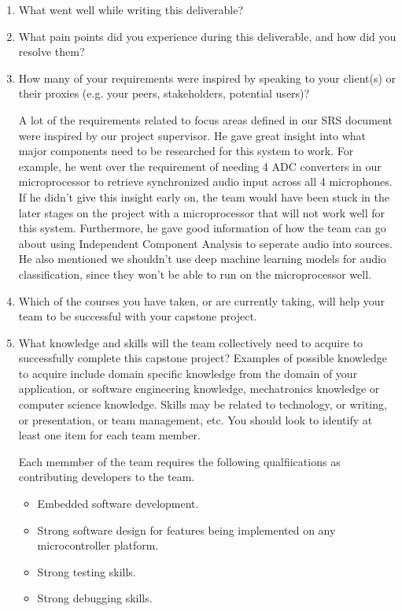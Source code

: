\begin{enumerate}
  \item What went well while writing this deliverable? 
  \item What pain points did you experience during this deliverable, and how did
  you resolve them?
  \item How many of your requirements were inspired by speaking to your
  client(s) or their proxies (e.g. your peers, stakeholders, potential users)?

  A lot of the requirements related to focus areas defined in our SRS document were inspired
  by our project supervisor. He gave great insight into what major components need to be researched
  for this system to work. For example, he went over the requirement of needing 4 ADC converters in 
  our microprocessor to retrieve synchronized audio input across all 4 microphones. If he didn't give
  this insight early on, the team would have been stuck in the later stages on the project with a
  microprocessor that will not work well for this system. Furthermore, he gave good information
  of how the team can go about using Independent Component Analysis to seperate audio into sources.
  He also mentioned we shouldn't use deep machine learning models for audio classification, 
  since they won't be able to run on the microprocessor well. 

  
  \item Which of the courses you have taken, or are currently taking, will help
  your team to be successful with your capstone project.

  \item What knowledge and skills will the team collectively need to acquire to
  successfully complete this capstone project?  Examples of possible knowledge
  to acquire include domain specific knowledge from the domain of your
  application, or software engineering knowledge, mechatronics knowledge or
  computer science knowledge.  Skills may be related to technology, or writing,
  or presentation, or team management, etc.  You should look to identify at
  least one item for each team member.

  Each memmber of the team requires the following qualfiications as contributing developers to the team.

  \begin{itemize}
    \item Embedded software development.
    \item Strong software design for features being implemented on any microcontroller platform. 
    \item Strong testing skills.
    \item Strong debugging skills. 
  \end{itemize}


\end{enumerate}
